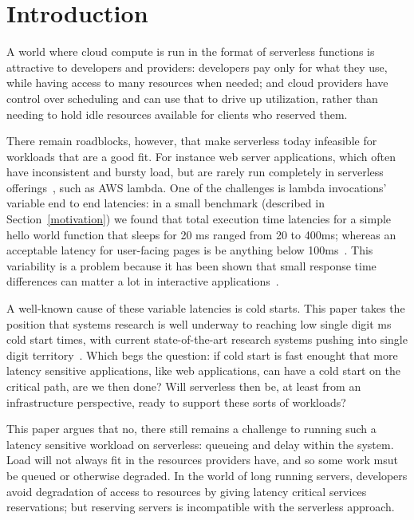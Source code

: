 \section{Introduction}

A world where cloud compute is run in the format of serverless functions is
attractive to developers and providers: developers pay only for what they use,
while having access to many resources when needed; and cloud providers have
control over scheduling and can use that to drive up utilization, rather than
needing to hold idle resources available for clients who reserved them.


There remain roadblocks, however, that make serverless today infeasible for
workloads that are a good fit. For instance web server applications, which often
have inconsistent and bursty load, but are rarely run completely in serverless
offerings~\cite{reddit-serverless1}, such as AWS lambda. One of the challenges
is lambda invocations' variable end to end latencies: in a small benchmark
(described in Section~\ref{motivation}) we found that total execution time
latencies for a simple hello world function that sleeps for 20 ms ranged from 20
to 400ms; whereas an acceptable latency for user-facing pages is be anything
below 100ms~\cite{page-load-time}. This variability is a problem because it has
been shown that small response time differences can matter a lot in interactive
applications~\cite{amz-page-load,google-page-load}.


A well-known cause of these variable latencies is cold starts. This paper takes
the position that systems research is well underway to reaching low single digit
ms cold start times, with current state-of-the-art research systems pushing into
single digit territory~\cite{sigmaos,mitosis}. Which begs the question: if cold
start is fast enought that more latency sensitive applications, like web
applications, can have a cold start on the critical path, are we then done? Will
serverless then be, at least from an infrastructure perspective, ready to
support these sorts of workloads?

This paper argues that no, there still remains a challenge to running such a
latency sensitive workload on serverless: queueing and delay within the system.
Load will not always fit in the resources providers have, and so some work msut
be queued or otherwise degraded. In the world of long running servers,
developers avoid degradation of access to resources by giving latency critical
services reservations; but reserving servers is incompatible with the serverless
approach. 


